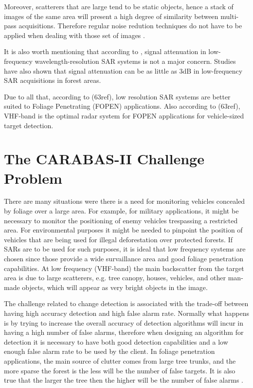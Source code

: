 Moreover, scatterers that are large tend to be static objects, hence a stack of images of the same area will present a high degree of 
similarity between multi-pass acquisitions. Therefore regular noise redution techniques do not have to be applied when dealing with those set of images \cite{ 61}.

It is also worth mentioning that according to \cite{ 66}, signal attenuation in low-frequency wavelength-resolution SAR systems 
is not a major concern. Studies \cite{63} have also shown that signal attenuation can be as little as 3dB in low-frequency SAR acquisitions in forest areas.


Due to all that, according to (63ref), low resolution SAR systems are better suited to Foliage Penetrating (FOPEN) applications.
Also according to (63ref), VHF-band is the optimal radar system for FOPEN applications for vehicle-sized target detection.

\section{The CARABAS-II Challenge Problem}
There are many situations were there is a need for monitoring vehicles concealed by foliage over a large area.
For example, for military applications, it might be necessary to monitor the positioning of enemy vehicles trespassing
a restricted area. For environmental purposes it might be needed to pinpoint the position of vehicles that are being used
for illegal deforestation over protected forests. If SARs are to be used for such purposes, it is ideal that low frequency systems
are chosen since those provide a wide survaillance area and good foliage penetration capabilities. 
At low frequency (VHF-band) the main backscatter from the target area is due to large scatterers, e.g. tree canopy, houses,
vehicles, and other man-made objects, which will appear as very bright objects in the image.

The challenge related to change detection is associated with the trade-off between having high accuracy detection and high false alarm rate.
Normally what happens is by trying to increase the overall accuracy of detection algorithms will incur in having a high number of false alarms, 
therefore when designing an algorithm for detection it is necessary to have both good detection capabilities and a low enough false alarm rate
to be used by the client. In foliage penetration applications, the main source of clutter comes from large tree trunks, and the more sparse the
forest is the less will be the number of false targets. It is also true that the larger the tree then the higher will be the number of false alarms \cite{Book_ML}.

